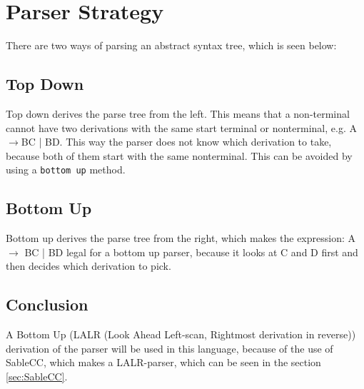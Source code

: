 \section{Parser Strategy}
\label{Parserstrategy}
There are two ways of parsing an abstract syntax tree, which is seen below:

\subsection*{Top Down}
Top down derives the parse tree from the left. This means that a non-terminal cannot have two derivations with the same start terminal or nonterminal, e.g. A $\rightarrow$BC | BD. This way the parser does not know which derivation to take, because both of them start with the same nonterminal.
This can be avoided by using a \texttt{bottom up} method.

\subsection*{Bottom Up}
Bottom up derives the parse tree from the right, which makes the expression: A $\rightarrow$ BC | BD legal for a bottom up parser, because it looks at C and D first and then decides which derivation to pick.

\subsection*{Conclusion}
A Bottom Up (LALR (Look Ahead Left-scan, Rightmost derivation in reverse)) derivation of the parser will be used in this language, because of the use of SableCC, which makes a LALR-parser, which can be seen in the section \ref{sec:SableCC}.